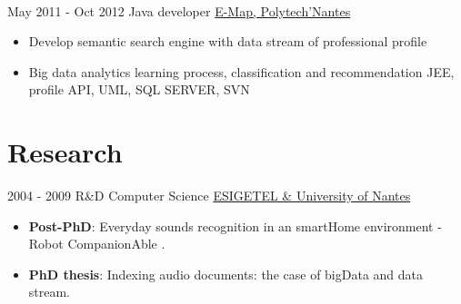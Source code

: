 \documentclass[letterpaper]{twentysecondcv} %
\begin{document}
\begin{twenty}
{\begin{itemize}
	    \end{itemize}
	    }
	   \\
	    \twentyitem
	    {May 2011 -}
	    {Oct 2012}
	    {Java developer}
	    {\href{}{E-Map, Polytech'Nantes}}
	    {}
	    {
	    \begin{itemize}
	    \item Develop semantic search engine with data stream of professional profile
	    \item Big data analytics learning process, classification and recommendation
	\medskip   \newline \footnotesize  JEE, profile API, UML, SQL SERVER, SVN
	    \end{itemize}
	    }


\end{twenty}

\section{Research}
\begin{twenty}
	\twentyitem
    	{2004 - 2009}
		{}
        {R\&D Computer Science}
        {\href{https://www.univ-nantes.fr/}{ESIGETEL \& University of Nantes}}
        {}
	       {       
	        {
	       \begin{itemize}
	       \item \textbf{Post-PhD}: Everyday sounds recognition in an smartHome environment - Robot CompanionAble .
	       \item	\textbf{PhD thesis}: Indexing audio documents: the case of bigData and data stream.
	      \end{itemize}
			}
	       }
  
\end{twenty}

\end{document}
